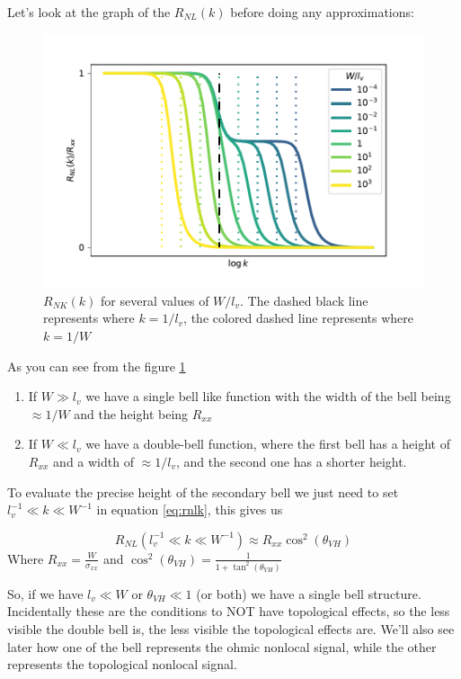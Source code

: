 Let's look at the graph of the $R_{NL}(k)$ before doing any approximations:
\begin{figure}[h!]
    \centering
    \includegraphics[width=\linewidth]{Immagini/rnl/widths.pdf}
    \caption{$R_{NK}(k)$ for several values of $W/l_v$. The dashed black line represents where $k=1/l_v$, the colored dashed line represents where $k=1/W$}
    \label{fig:RNLk}
\end{figure}
As you can see from the figure \ref{fig:RNLk} 
\begin{enumerate}
    \item If $W\gg l_v$ we have a single bell like function with the width of the bell being $\approx 1/W$ and the height being $R_{xx}$ 
    \item If $W\ll l_v$ we have a double-bell function, where the first bell has a height of $R_{xx}$ and a width of $\approx 1/l_v$, and the second one has a shorter height.
\end{enumerate}    
To evaluate the precise height of the secondary bell we just need to set $l_v^{-1}\ll k \ll W^{-1}$ in equation \ref{eq:rnlk}, this gives us

\begin{equation}
    R_{NL}(l_v^{-1}\ll k \ll W^{-1})\approx R_{xx}\cos^2(\theta_{VH})   
    \label{eq:plateau} 
\end{equation}
Where $R_{xx}=\frac{W}{\sigma_{xx}}$ and $\cos^2(\theta_{VH})=\frac{1}{1+\tan^2(\theta_{VH})}$

So, if we have $l_v\ll W$ or $\theta_{VH}\ll 1$ (or both) we have a single bell structure. Incidentally these are the conditions to NOT have topological effects, so the less visible the double bell is, the less visible the topological effects are. We'll also see later how one of the bell represents the ohmic nonlocal signal, while the other represents the topological nonlocal signal. 

